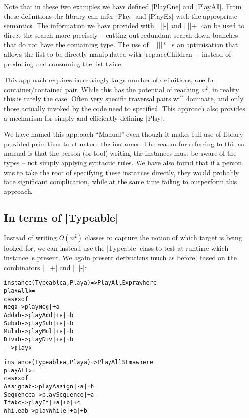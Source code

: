 \documentclass[preprint]{sigplanconf}
\newenvironment{code}{\begin{alltt}\small}{\end{alltt}}
\begin{document}
Note that in these two examples we have defined |PlayOne| and |PlayAll|. From these definitions the library can infer |Play| and |PlayEx| with the appropriate semantics. The information we have provided with | ||-| and | ||+| can be used to direct the search more precisely -- cutting out redundant search down branches that do not have the containing type. The use of | ||||*| is an optimisation that allows the list to be directly manipulated with |replaceChildren| -- instead of producing and consuming the list twice.

This approach requires increasingly large number of definitions, one for container/contained pair. While this has the potential of reaching $n^2$, in reality this is rarely the case. Often very specific traversal pairs will dominate, and only those actually invoked by the code need to specified. This approach also provides a mechanism for simply and efficiently defining |Play|.

We have named this approach ``Manual'' even though it makes full use of library provided primitives to structure the instances. The reason for referring to this as manual is that the person (or tool) writing the instances must be aware of the types -- not simply applying syntactic rules. We have also found that if a person was to take the root of specifying these instances directly, they would probably face significant complication, while at the same time failing to outperform this approach.


\subsection{In terms of |Typeable|}

Instead of writing $O(n^2)$ classes to capture the notion of which target is being looked for, we can instead use the |Typeable| class to test at runtime which instance is present. We again present derivations much as before, based on the combinators | ||+| and | ||-|:

\begin{code}
instance (Typeable a, Play a) => PlayAll Expr a where
    playAll x =
        case x of
            Neg a    ->  play Neg  |+ a
            Add a b  ->  play Add  |+ a |+ b
            Sub a b  ->  play Sub  |+ a |+ b
            Mul a b  ->  play Mul  |+ a |+ b
            Div a b  ->  play Div  |+ a |+ b
            _        ->  play x

instance (Typeable a, Play a) => PlayAll Stm a where
    playAll x =
        case x of
            Assign    a b    -> play Assign    |-  a |+ b
            Sequence  a      -> play Sequence  |+  a
            If        a b c  -> play If        |+  a |+ b |+ c
            While     a b    -> play While     |+  a |+ b
\end{code}
\end{document}
